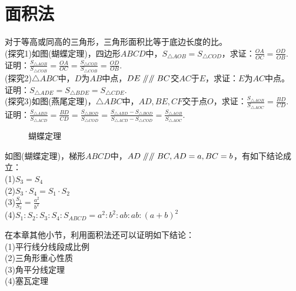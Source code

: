 \section{面积法}
\begin{theorem}
    对于等高或同高的三角形，三角形面积比等于底边长度的比。\\
    (探究1)如图(蝴蝶定理)，四边形$ABCD$中，$S_{\triangle AOB}=S_{\triangle COD}$，求证：$\frac{OA}{OC}=\frac{OD}{OB}.$ \\
    证明：$\frac{S_{\triangle AOB}}{S_{\triangle COB}}=\frac{OA}{OC}=\frac{S_{\triangle COD}}{S_{\triangle COB}}=\frac{OD}{OB}$. \\
    (探究2)$\triangle ABC$中，$D$为$AB$中点，$DE\mathrel{/\mkern-5mu/} \mathrel{/\mkern-5mu/} BC$交$AC$于$E$，求证：$E$为$AC$中点。\\
    证明：$S_{\triangle ADE}=S_{\triangle BDE}=S_{\triangle CDE}.$ \\
    (探究3)如图(燕尾定理)，$\triangle ABC$中，$AD,BE,CF$交于点$O$，求证：$\frac{S_{\triangle AOB}}{S_{\triangle AOC}}=\frac{BD}{CD}$. \\
    证明：$\frac{S_{\triangle ABD}}{S_{\triangle ACD}}=\frac{BD}{CD}=\frac{S_{\triangle BOD}}{S_{\triangle COD}}=\frac{S_{\triangle ABD}-S_{\triangle BOD}}{S_{\triangle ACD}-S_{\triangle COD}}=\frac{S_{\triangle AOB}}{S_{\triangle AOC}}.$
\end{theorem}
\begin{figure}[H]
    \centering
    \resizebox{4cm}{!}{}
    \caption{蝴蝶定理}
\end{figure}
\begin{definition}
    如图(蝴蝶定理)，梯形$ABCD$中，$AD\mathrel{/\mkern-5mu/}\mathrel{/\mkern-5mu/} BC,AD=a,BC=b$，有如下结论成立：\\
    (1)$S_3=S_4$ \\
    (2)$S_3·S_4=S_1·S_2$ \\
    (3)$\frac{S_1}{S_2}=\frac{a^2}{b^2}$ \\
    (4)$S_1:S_2:S_3:S_4:S_{ABCD}=a^2:b^2:ab:ab:(a+b)^2$
\end{definition}
\begin{theorem}
    在本章其他小节，利用面积法还可以证明如下结论：\\
    (1)平行线分线段成比例 \\
    (2)三角形重心性质 \\
    (3)角平分线定理 \\
    (4)塞瓦定理
\end{theorem}
\clearpage
